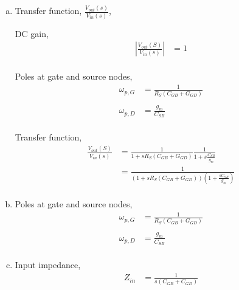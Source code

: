 \documentclass{article}
\begin{document}
\begin{enumerate}[(a)]
\item Transfer function, \(\frac{V_{out}(s)}{V_{in}(s)}\),

DC gain,
\begin{equation*}
\begin{aligned}
|\frac{V_{out}(S)}{V_{in}(s)}| &= 1 \\
\end{aligned}
\end{equation*}

Poles at gate and source nodes,
\begin{equation*}
\begin{aligned}
\omega_{p,G} &= \frac{1}{R_{S}(C_{GB} + G_{GD})} \\
\\
\omega_{p,D} &= \frac{g_{m}}{C_{SB}} \\
\end{aligned}
\end{equation*}

Transfer function,
\begin{equation*}
\begin{aligned}
\frac{V_{out}(S)}{V_{in}(s)} &= \frac{1}{1 + sR_{S}(C_{GB} + G_{GD})}\frac{1}{1 + s\frac{C_{SB}}{g_{m}}} \\
&= \frac{1}{(1 + sR_{S}(C_{GB} + G_{GD}))(1 + \frac{sC_{SB}}{g_{m}})} \\
\end{aligned}
\end{equation*}

\item Poles at gate and source nodes,
\begin{equation*}
\begin{aligned}
\omega_{p,G} &= \frac{1}{R_{S}(C_{GB} + G_{GD})} \\
\\
\omega_{p,D} &= \frac{g_{m}}{C_{SB}} \\
\end{aligned}
\end{equation*}

\item Input impedance,
\begin{equation*}
\begin{aligned}
Z_{in} &= \frac{1}{s(C_{GB} + C_{GD})} \\
\end{aligned}
\end{equation*}
\end{enumerate}
\end{document}
